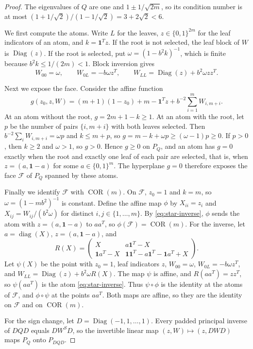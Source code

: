 \begin{proof}
The eigenvalues of $Q$ are one and $1\pm1/\sqrt{2m}$, so its condition
number is at most $(1+1/\sqrt2)/(1-1/\sqrt2)=3+2\sqrt2<6$.

We first compute the atoms. Write $L$ for the leaves, $z\in\{0,1\}^{2m}$
for the leaf indicators of an atom, and $k=\mathbf1^Tz$. If the root is
not selected, the leaf block of $W$ is $\operatorname{Diag}(z)$. If the
root is selected, put $\omega=(1-b^2k)^{-1}$, which is finite because
$b^2k\le1/(2m)<1$. Block inversion gives
\begin{equation}\label{eq:star-inverse}
 W_{00}=\omega,\qquad W_{0L}=-b\omega z^T,\qquad
 W_{LL}=\operatorname{Diag}(z)+b^2\omega zz^T.
\end{equation}

Next we expose the face. Consider the affine function
\[
 g(z_0,z,W)=(m+1)(1-z_0)+m-\mathbf1^Tz
                         +b^{-2}\sum_{i=1}^mW_{i,m+i}.
\]
At an atom without the root, $g=2m+1-k\ge1$. At an atom with the root,
let $p$ be the number of pairs $\{i,m+i\}$ with both leaves selected.
Then $b^{-2}\sum_iW_{i,m+i}=\omega p$ and $k\le m+p$, so
$g=m-k+\omega p\ge(\omega-1)p\ge0$. If $p>0$, then $k\ge2$ and
$\omega>1$, so $g>0$. Hence $g\ge0$ on $P_Q$, and an atom has $g=0$
exactly when the root and
exactly one leaf of each pair are selected, that is, when
$z=(a,\mathbf1-a)$ for some $a\in\{0,1\}^m$. The hyperplane $g=0$
therefore exposes the face $\mathcal F$ of $P_Q$ spanned by these atoms.

Finally we identify $\mathcal F$ with $\operatorname{COR}(m)$. On
$\mathcal F$, $z_0=1$ and $k=m$, so $\omega=(1-mb^2)^{-1}$ is
constant. Define the affine map $\phi$ by $X_{ii}=z_i$ and
$X_{ij}=W_{ij}/(b^2\omega)$ for distinct $i,j\in\{1,\ldots,m\}$. By
\eqref{eq:star-inverse}, $\phi$ sends the atom with $z=(a,\mathbf1-a)$
to $aa^T$, so $\phi(\mathcal F)=\operatorname{COR}(m)$. For the inverse,
let $a=\operatorname{diag}(X)$, $z=(a,\mathbf1-a)$, and
\[
 R(X)=\begin{pmatrix}
 X&a\mathbf1^T-X\\
 \mathbf1a^T-X&\mathbf1\mathbf1^T-a\mathbf1^T-\mathbf1a^T+X
 \end{pmatrix}.
\]
Let $\psi(X)$ be the point with $z_0=1$, leaf indicators $z$,
$W_{00}=\omega$, $W_{0L}=-b\omega z^T$, and
$W_{LL}=\operatorname{Diag}(z)+b^2\omega R(X)$. The map $\psi$ is affine,
and $R(aa^T)=zz^T$, so $\psi(aa^T)$ is the atom \eqref{eq:star-inverse}.
Thus $\psi\circ\phi$ is the identity at the atoms of $\mathcal F$, and
$\phi\circ\psi$ at the points $aa^T$. Both maps are affine, so they are
the identity on $\mathcal F$ and on $\operatorname{COR}(m)$.

For the sign change, let $D=\operatorname{Diag}(-1,1,\ldots,1)$. Every
padded principal inverse of $DQD$ equals $DW^SD$, so the invertible
linear map $(z,W)\mapsto(z,DWD)$ maps $P_Q$ onto $P_{DQD}$.
\end{proof}

